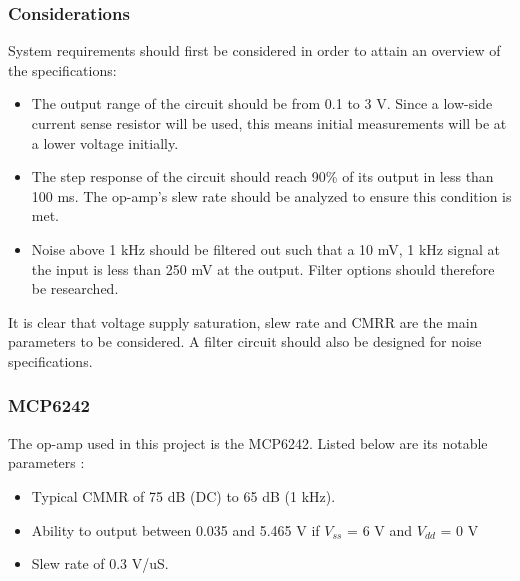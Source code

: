 \subsubsection{Considerations}\label{sec:opamps_considerations}
System requirements should first be considered in order to attain an overview of the specifications:
\begin{itemize}
    \item The output range of the circuit should be from 0.1 to 3 V. Since a low-side current sense resistor will be used, this means initial measurements will be at a lower voltage initially.
    \item The step response of the circuit should reach 90\% of its output in less than 100 ms. The op-amp's slew rate should be analyzed to ensure this condition is met.
    \item Noise above 1 kHz should be filtered out such that a 10 mV, 1 kHz signal at the input is less than 250 mV at the output. Filter options should therefore be researched.
\end{itemize}

It is clear that voltage supply saturation, slew rate and CMRR are the main parameters to be considered. A filter circuit should also be designed for noise specifications.

\subsubsection{MCP6242}\label{sec:opamps_MCP6242}
The op-amp used in this project is the MCP6242. Listed below are its notable parameters \cite{WebsiteOpMCP6242}:
\begin{itemize}
    \item Typical CMMR of 75 dB (DC) to 65 dB (1 kHz).
    \item Ability to output between 0.035 and 5.465 V if $V_{ss}$ = 6 V and $V_{dd}$ = 0 V
    \item Slew rate of 0.3 V/uS.
\end{itemize}

